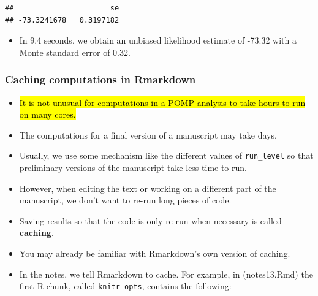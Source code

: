 \documentclass[]{article}
\newenvironment{Shaded}{\begin{snugshade}}{\end{snugshade}}
\newcommand{\KeywordTok}[1]{\textcolor[rgb]{0.13,0.29,0.53}{\textbf{#1}}}
\newcommand{\DataTypeTok}[1]{\textcolor[rgb]{0.13,0.29,0.53}{#1}}
\newcommand{\OtherTok}[1]{\textcolor[rgb]{0.56,0.35,0.01}{#1}}
\newcommand{\OperatorTok}[1]{\textcolor[rgb]{0.81,0.36,0.00}{\textbf{#1}}}
\newcommand{\NormalTok}[1]{#1}
\providecommand{\tightlist}{%
  \setlength{\itemsep}{0pt}\setlength{\parskip}{0pt}}
\begin{document}
\begin{verbatim}
##                      se 
## -73.3241678   0.3197182
\end{verbatim}

\begin{itemize}
\tightlist
\item
  In 9.4 seconds, we obtain an unbiased likelihood estimate of -73.32
  with a Monte standard error of 0.32.
\end{itemize}

\subsubsection{Caching computations in
Rmarkdown}\label{caching-computations-in-rmarkdown}

\begin{itemize}
\item
  \hl{It is not unusual for computations in a POMP analysis to take hours to
  run on many cores.}
\item
  The computations for a final version of a manuscript may take days.
\item
  Usually, we use some mechanism like the different values of
  \texttt{run\_level} so that preliminary versions of the manuscript
  take less time to run.
\item
  However, when editing the text or working on a different part of the
  manuscript, we don't want to re-run long pieces of code.
\item
  Saving results so that the code is only re-run when necessary is
  called \textbf{caching}.
\item
  You may already be familiar with Rmarkdown's own version of caching.
\item
  In the notes, we tell Rmarkdown to cache. For example, in
  (notes13.Rmd) the first R chunk, called \texttt{knitr-opts}, contains
  the following:
\end{itemize}

\begin{Shaded}
\end{Shaded}
\end{document}
